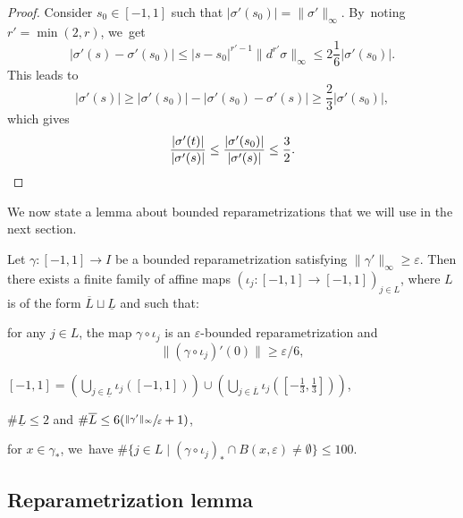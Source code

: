 \begin{proof}
Consider $s_0 \in [-1,1]$ such that $| \sigma'(s_0) | = \|\sigma'\|_{\infty}$. By~noting $r' = \min(2,r)$, we~get
\[
|\sigma'(s) - \sigma'(s_0)| \leq |s-s_0|^{r'-1} \| d^{r'} \sigma \|_{\infty}
\leq 2 \frac{1}{6} |\sigma'(s_0)|.
\]
This leads to
\[
|\sigma'(s)| \geq |\sigma'(s_0)| - |\sigma'(s_0) - \sigma'(s)| \geq \frac{2}{3} | \sigma'(s_0)|,
\]
which gives
\[
\frac{| \sigma'(t) |}{|\sigma'(s)|} \leq \frac{| \sigma'(s_0) |}{|\sigma'(s)|} \leq \frac{3}{2}.\qedhere
\]
\end{proof}

We now state a lemma about bounded reparametrizations that we will use in the next section.

\begin{lem}[{\cite[Lem.\,6]{MR4701884}}]
\label{lem:decoup-arbre-geom}
Let $\gamma : [-1, 1] \to I$ be a bounded reparametrization satisfying $\| \gamma' \|_{\infty} \geq \varepsilon$.
Then there exists a finite family of affine maps $(\iota_j : [-1, 1] \to [-1, 1])_{j \in L}$, where $L$ is of the form $\overline{L} \sqcup \underline{L}$ and such that:
\begin{enumeratei}
\item
for any $j \in L$, the map $\gamma \circ \iota_j$ is an $\varepsilon$-bounded reparametrization and
\[
\| (\gamma \circ \iota_j)'(0) \| \geq \varepsilon / 6,
\]
\item
$[-1, 1] = \left (\bigcup_{j \in \underline{L}} \iota_j([-1, 1]) \right) \cup \left (\bigcup_{j \in \overline{L}} \iota_j\left (\left [ - \frac{1}{3}, \frac{1}{3} \right ] \right) \right)$,
\item
$\# \underline{L} \leq 2$ and $\# \overline{L} \leq 6 (\sfrac{\| \gamma' \|_{\infty}}{\varepsilon} + 1)$,
\item
for $x \in \gamma_*$, we~have $\# \{ j \in L \mid (\gamma \circ \iota_j)_* \cap B(x, \varepsilon) \neq \emptyset \} \leq 100$.
\end{enumeratei}
\end{lem}

\subsection{Reparametrization lemma}

